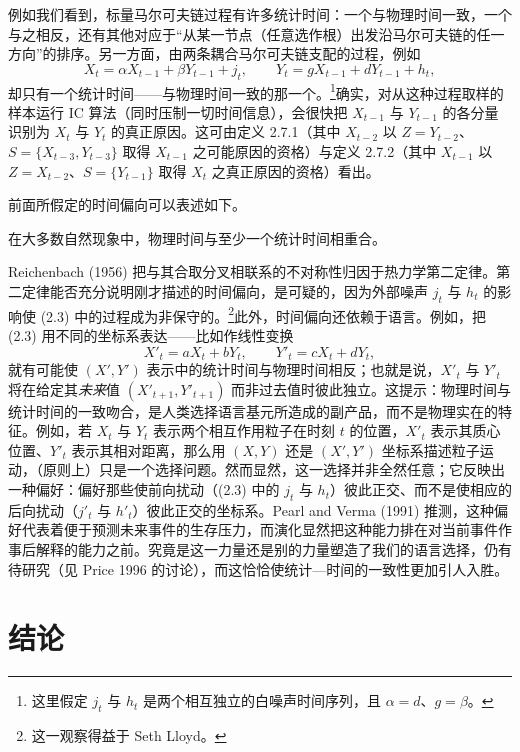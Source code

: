 例如我们看到，标量马尔可夫链过程有许多统计时间：一个与物理时间一致，一个与之相反，还有其他对应于“从某一节点（任意选作根）出发沿马尔可夫链的任一方向”的排序。另一方面，由两条耦合马尔可夫链支配的过程，例如
\begin{equation}
X_t=\alpha X_{t-1}+\beta Y_{t-1}+j_t,\qquad
Y_t=gX_{t-1}+dY_{t-1}+h_t, \tag{2.3}
\end{equation}
却只有一个统计时间——与物理时间一致的那一个。\footnote{这里假定 $j_t$ 与 $h_t$ 是两个相互独立的白噪声时间序列，且 $\alpha=d$、$g=\beta$。}确实，对从这种过程取样的样本运行 IC 算法（同时压制一切时间信息），会很快把 $X_{t-1}$ 与 $Y_{t-1}$ 的各分量识别为 $X_t$ 与 $Y_t$ 的真正原因。这可由定义 2.7.1（其中 $X_{t-2}$ 以 $Z=Y_{t-2}$、$S=\{X_{t-3},Y_{t-3}\}$ 取得 $X_{t-1}$ 之可能原因的资格）与定义 2.7.2（其中 $X_{t-1}$ 以 $Z=X_{t-2}$、$S=\{Y_{t-1}\}$ 取得 $X_t$ 之真正原因的资格）看出。

前面所假定的时间偏向可以表述如下。

\begin{conjecture}[时间偏向]
在大多数自然现象中，物理时间与至少一个统计时间相重合。
\end{conjecture}

Reichenbach (1956) 把与其合取分叉相联系的不对称性归因于热力学第二定律。第二定律能否充分说明刚才描述的时间偏向，是可疑的，因为外部噪声 $j_t$ 与 $h_t$ 的影响使 \textup{(2.3)} 中的过程成为非保守的。\footnote{这一观察得益于 Seth Lloyd。}此外，时间偏向还依赖于语言。例如，把 \textup{(2.3)} 用不同的坐标系表达——比如作线性变换
\[
X'_t=aX_t+bY_t,\qquad Y'_t=cX_t+dY_t,
\]
就有可能使 $(X',Y')$ 表示中的统计时间与物理时间相反；也就是说，$X'_t$ 与 $Y'_t$ 将在给定其\emph{未来}值 $(X'_{t+1},Y'_{t+1})$ 而非过去值时彼此独立。这提示：物理时间与统计时间的一致吻合，是人类选择语言基元所造成的副产品，而不是物理实在的特征。例如，若 $X_t$ 与 $Y_t$ 表示两个相互作用粒子在时刻 $t$ 的位置，$X'_t$ 表示其质心位置、$Y'_t$ 表示其相对距离，那么用 $(X,Y)$ 还是 $(X',Y')$ 坐标系描述粒子运动，（原则上）只是一个选择问题。然而显然，这一选择并非全然任意；它反映出一种偏好：偏好那些使前向扰动（\textup{(2.3)} 中的 $j_t$ 与 $h_t$）彼此正交、而不是使相应的后向扰动（$j'_t$ 与 $h'_t$）彼此正交的坐标系。Pearl and Verma (1991) 推测，这种偏好代表着便于预测未来事件的生存压力，而演化显然把这种能力排在对当前事件作事后解释的能力之前。究竟是这一力量还是别的力量塑造了我们的语言选择，仍有待研究（见 Price 1996 的讨论），而这恰恰使统计—时间的一致性更加引人入胜。

\section{结论}

